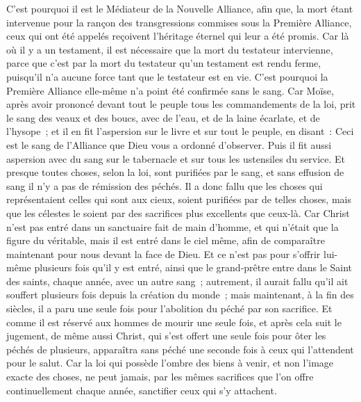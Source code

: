 \begin{multicols}{2}
C'est pourquoi il est le Médiateur de la Nouvelle Alliance, afin que, la mort étant intervenue pour la rançon des transgressions commises sous la Première Alliance, ceux qui ont été appelés reçoivent l'héritage éternel qui leur a été promis.
Car là où il y a un testament, il est nécessaire que la mort du testateur intervienne,
parce que c'est par la mort du testateur qu'un testament est rendu ferme, puisqu'il n'a aucune force tant que le testateur est en vie.
C'est pourquoi la Première Alliance elle-même n'a point été confirmée sans le sang.
Car Moïse, après avoir prononcé devant tout le peuple tous les commandements de la loi, prit le sang des veaux et des boucs, avec de l'eau, et de la laine écarlate, et de l'hysope~; et il en fit l'aspersion sur le livre et sur tout le peuple, en disant~:
Ceci est le sang de l'Alliance que Dieu vous a ordonné d'observer.
Puis il fit aussi aspersion avec du sang sur le tabernacle et sur tous les ustensiles du service.
Et presque toutes choses, selon la loi, sont purifiées par le sang, et sans effusion de sang il n'y a pas de rémission des péchés.
Il a donc fallu que les choses qui représentaient celles qui sont aux cieux, soient purifiées par de telles choses, mais que les célestes le soient par des sacrifices plus excellents que ceux-là.
Car Christ n'est pas entré dans un sanctuaire fait de main d'homme, et qui n'était que la figure du véritable, mais il est entré dans le ciel même, afin de comparaître maintenant pour nous devant la face de Dieu.
Et ce n'est pas pour s'offrir lui-même plusieurs fois qu'il y est entré, ainsi que le grand-prêtre entre dans le Saint des saints, chaque année, avec un autre sang~;
autrement, il aurait fallu qu'il ait souffert plusieurs fois depuis la création du monde~; mais maintenant, à la fin des siècles, il a paru une seule fois pour l'abolition du péché par son sacrifice.
Et comme il est réservé aux hommes de mourir une seule fois, et après cela suit le jugement,
de même aussi Christ, qui s'est offert une seule fois pour ôter les péchés de plusieurs, apparaîtra sans péché une seconde fois à ceux qui l'attendent pour le salut.
\VerseOne{}Car la loi qui possède l'ombre des biens à venir, et non l'image exacte des choses, ne peut jamais, par les mêmes sacrifices que l'on offre continuellement chaque année, sanctifier ceux qui s'y attachent.

\end{multicols}
